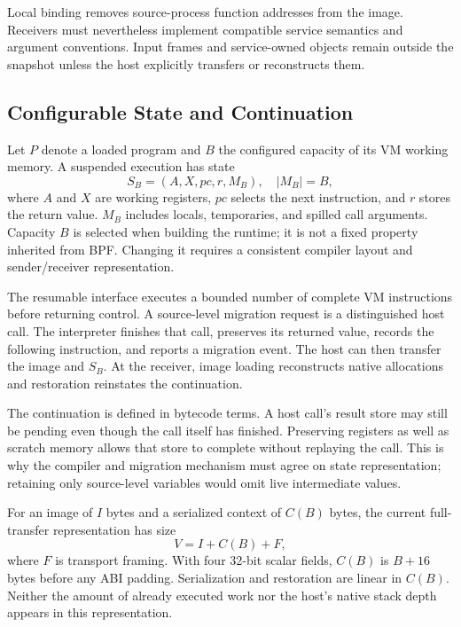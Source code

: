 \documentclass[conference,letterpaper]{IEEEtran}
\begin{document}
Local binding removes source-process function addresses from the image. Receivers must nevertheless implement compatible service semantics and argument conventions. Input frames and service-owned objects remain outside the snapshot unless the host explicitly transfers or reconstructs them.

\subsection{Configurable State and Continuation}
Let $P$ denote a loaded program and $B$ the configured capacity of its VM working memory. A suspended execution has state
\begin{equation}
S_B=(A,X,pc,r,M_B), \quad |M_B|=B,
\label{eq:state}
\end{equation}
where $A$ and $X$ are working registers, $pc$ selects the next instruction, and $r$ stores the return value. $M_B$ includes locals, temporaries, and spilled call arguments. Capacity $B$ is selected when building the runtime; it is not a fixed property inherited from BPF. Changing it requires a consistent compiler layout and sender/receiver representation.

The resumable interface executes a bounded number of complete VM instructions before returning control. A source-level migration request is a distinguished host call. The interpreter finishes that call, preserves its returned value, records the following instruction, and reports a migration event. The host can then transfer the image and $S_B$. At the receiver, image loading reconstructs native allocations and restoration reinstates the continuation.

The continuation is defined in bytecode terms. A host call's result store may still be pending even though the call itself has finished. Preserving registers as well as scratch memory allows that store to complete without replaying the call. This is why the compiler and migration mechanism must agree on state representation; retaining only source-level variables would omit live intermediate values.

For an image of $I$ bytes and a serialized context of $C(B)$ bytes, the current full-transfer representation has size
\begin{equation}
V=I+C(B)+F,
\label{eq:volume}
\end{equation}
where $F$ is transport framing. With four 32-bit scalar fields, $C(B)$ is $B+16$ bytes before any ABI padding. Serialization and restoration are linear in $C(B)$. Neither the amount of already executed work nor the host's native stack depth appears in this representation.
\end{document}
